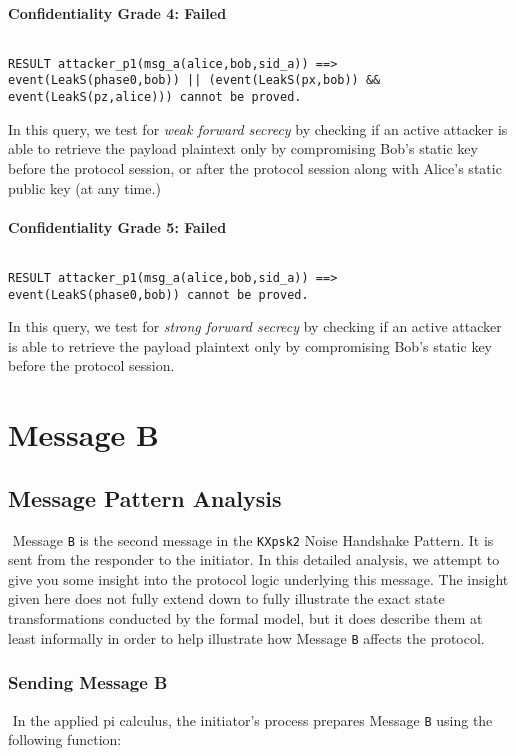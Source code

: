 \paragraph{Confidentiality Grade 4: Failed}$ $
\begin{lstlisting}
RESULT attacker_p1(msg_a(alice,bob,sid_a)) ==> event(LeakS(phase0,bob)) || (event(LeakS(px,bob)) && event(LeakS(pz,alice))) cannot be proved.
\end{lstlisting}

In this query, we test for \emph{weak forward secrecy} by checking if an active attacker is able to retrieve the payload plaintext only by compromising Bob's static key before the protocol session, or after the protocol session along with Alice's static public key (at any time.)


\paragraph{Confidentiality Grade 5: Failed}$ $
\begin{lstlisting}
RESULT attacker_p1(msg_a(alice,bob,sid_a)) ==> event(LeakS(phase0,bob)) cannot be proved.
\end{lstlisting}

In this query, we test for \emph{strong forward secrecy} by checking if an active attacker is able to retrieve the payload plaintext only by compromising Bob's static key before the protocol session.


\section{ Message B}

\subsection{Message Pattern Analysis}$ $
Message \texttt{B} is the second message in the \texttt{KXpsk2} Noise Handshake Pattern. It is sent from the responder to the initiator. In this detailed analysis, we attempt to give you some insight into the protocol logic underlying this message. The insight given here does not fully extend down to fully illustrate the exact state transformations conducted by the formal model, but it does describe them at least informally in order to help illustrate how Message \texttt{B} affects the protocol.


\subsubsection{Sending Message B}$ $
In the applied pi calculus, the initiator's process prepares Message \texttt{B} using the following function:


